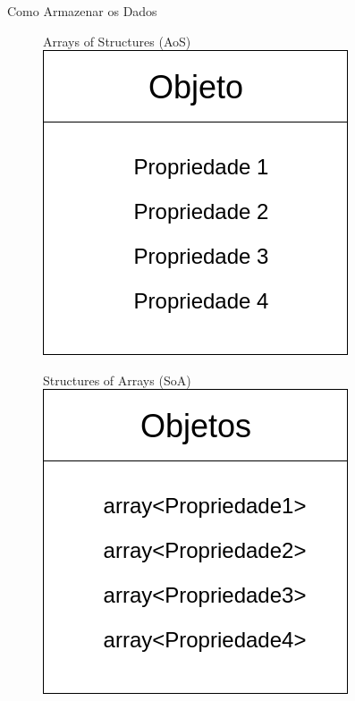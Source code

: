 \documentclass{beamer}
\begin{document}
\begin{frame}[t]{Como Armazenar os Dados}
    \begin{figure}
        \begin{minipage}[b]{0.35\textwidth}
        Arrays of Structures (AoS)
        \centering
            \includegraphics[width=\textwidth]{figuras/aosscheme}
        \end{minipage}
        \hspace{1.5cm}
        \begin{minipage}[b]{0.35\textwidth}
        \centering
        Structures of Arrays (SoA)
            \includegraphics[width=\textwidth]{figuras/soascheme}
        \end{minipage}
    \end{figure}
\end{frame}
\end{document}
